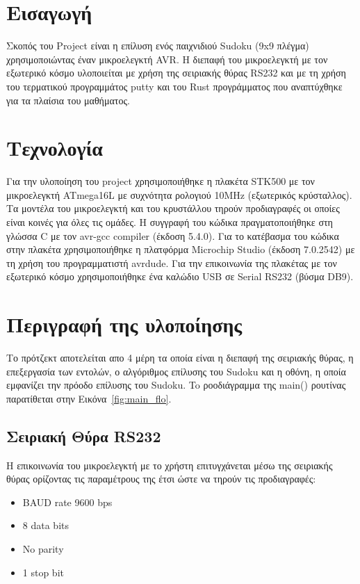 \documentclass[a4paper,12pt]{article}
\begin{document}


\newpage
\tableofcontents
\newpage

\section{Εισαγωγή}
Σκοπός του Project είναι η επίλυση ενός παιχνιδιού Sudoku (9x9 πλέγμα) χρησιμοποιώντας έναν μικροελεγκτή AVR. Η διεπαφή του μικροελεγκτή με τον εξωτερικό κόσμο υλοποιείται με χρήση της σειριακής θύρας RS232 και με τη χρήση του τερματικού προγραμμάτος putty και του Rust προγράμματος που αναπτύχθηκε για τα πλαίσια του μαθήματος.

\section{Τεχνολογία}
Για την υλοποίηση του project χρησιμοποιήθηκε η πλακέτα STK500 με τον μικροελεγκτή ATmega16L με συχνότητα ρολογιού 10MHz (εξωτερικός κρύσταλλος). Τα μοντέλα του μικροελεγκτή και του κρυστάλλου τηρούν προδιαγραφές οι οποίες είναι κοινές για όλες τις ομάδες. Η συγγραφή του κώδικα πραγματοποιήθηκε στη γλώσσα C με τον avr-gcc compiler (έκδοση 5.4.0). Για το κατέβασμα του κώδικα στην πλακέτα χρησιμοποιήθηκε η πλατφόρμα Microchip Studio (έκδοση 7.0.2542) με τη χρήση του προγραμματιστή avrdude. Για την επικοινωνία της πλακέτας με τον εξωτερικό κόσμο χρησιμοποιήθηκε ένα καλώδιο USB σε Serial RS232 (βύσμα DB9).


\section{Περιγραφή της υλοποίησης}
Το πρότζεκτ αποτελείται απο 4 μέρη τα οποία είναι η διεπαφή της σειριακής θύρας, η επεξεργασία των εντολών, ο αλγόριθμος επίλυσης του Sudoku και η οθόνη, η οποία εμφανίζει την πρόοδο επίλυσης του Sudoku. To ροοδιάγραμμα της main() ρουτίνας παρατίθεται στην Εικόνα~\ref{fig:main_flo}.\\

\subsection{Σειριακή Θύρα RS232}
Η επικοινωνία του μικροελεγκτή με το χρήστη επιτυγχάνεται μέσω της σειριακής θύρας ορίζοντας τις παραμέτρους της έτσι ώστε να τηρούν τις προδιαγραφές:\\
\begin{itemize}
	\item BAUD rate 9600 bps
	\item 8 data bits
	\item No parity
	\item 1 stop bit
\end{itemize}
\end{document}
